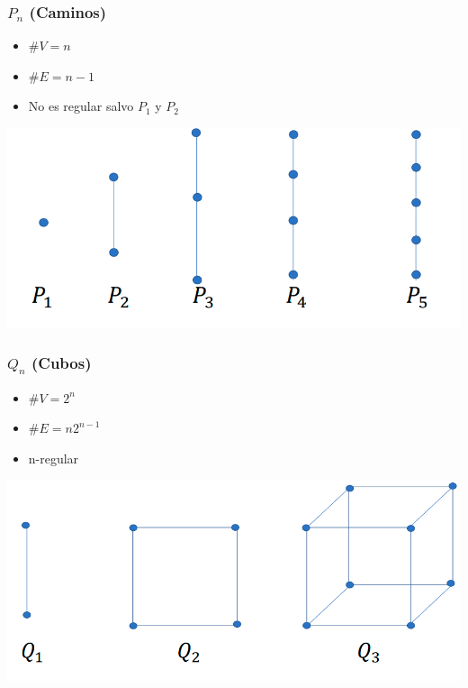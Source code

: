 \documentclass{article}
\begin{document}
\subsubsection*{$P_n$ (Caminos)}
\begin{minipage}[c]{.45\textwidth}
\begin{itemize}
    \item $\#V = n$
    \item $\#E = n - 1$
    \item No es regular salvo $P_1$ y $P_2$
\end{itemize}
\end{minipage}
\begin{minipage}[c]{.45\textwidth}
    \includegraphics[width=\textwidth]{grafo camino.PNG}
\end{minipage}
\subsubsection*{$Q_n$ (Cubos)}
\begin{minipage}[c]{.45\textwidth}
\begin{itemize}
    \item $\#V = 2^n$
    \item $\#E = n2^{n-1}$
    \item n-regular
\end{itemize}
\end{minipage}
\begin{minipage}[c]{.45\textwidth}
    \includegraphics[width=\textwidth]{grafo cubo.PNG}
\end{minipage}
\end{document}
